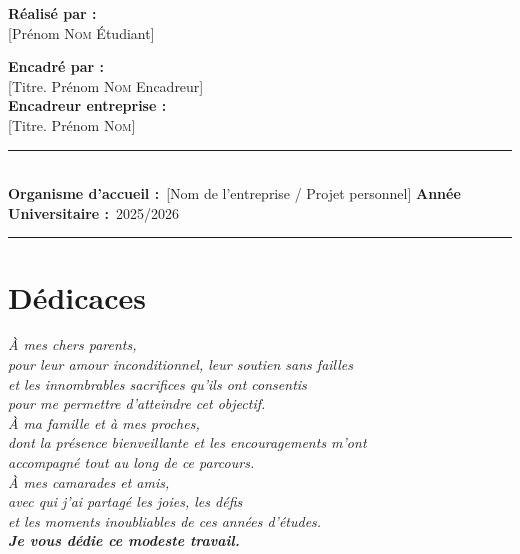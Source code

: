 \documentclass[12pt,a4paper,oneside]{report}
\begin{document}
\begin{titlepage}
\vspace{0.8cm}

\begin{minipage}[t]{0.45\textwidth}
  \raggedright
  \textbf{Réalisé par :}\\[5pt]
  [Prénom \textsc{Nom} Étudiant]
\end{minipage}%
\hfill%
\begin{minipage}[t]{0.45\textwidth}
  \raggedleft
  \textbf{Encadré par :}\\[5pt]
  [Titre. Prénom \textsc{Nom} Encadreur]\\[8pt]
  \textbf{Encadreur entreprise :}\\[5pt]
  [Titre. Prénom \textsc{Nom}]
\end{minipage}

\vspace{0.8cm}
{\color{aegisgray}\rule{\textwidth}{0.4pt}}\\[5pt]
\textbf{Organisme d'accueil :}~[Nom de l'entreprise / Projet personnel]
\hfill
\textbf{Année Universitaire :}~2025/2026\\[5pt]
{\color{aegisblue}\rule{\textwidth}{1pt}}

\end{titlepage}

\clearpage
\chapter*{Dédicaces}
\thispagestyle{plain}

\vspace*{2.5cm}
\begin{center}
\begin{minipage}{0.78\textwidth}
\centering
\textit{%
À mes chers parents,\\[5pt]
pour leur amour inconditionnel, leur soutien sans failles\\
et les innombrables sacrifices qu'ils ont consentis\\
pour me permettre d'atteindre cet objectif.\\[1cm]
À ma famille et à mes proches,\\[5pt]
dont la présence bienveillante et les encouragements m'ont\\
accompagné tout au long de ce parcours.\\[1cm]
À mes camarades et amis,\\[5pt]
avec qui j'ai partagé les joies, les défis\\
et les moments inoubliables de ces années d'études.\\[1.2cm]
\textbf{Je vous dédie ce modeste travail.}%
}
\end{minipage}
\end{center}
\end{document}

